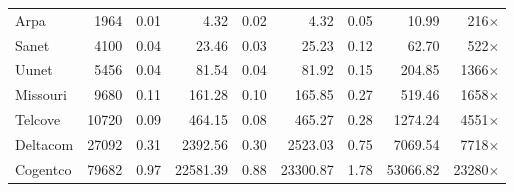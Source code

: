 \begin{tabular}{|l|r|rr|rr|rr|r|}
Arpa & 1964 & 0.01 & 4.32 & 0.02 & 4.32 & 0.05 & 10.99 & 216$\times$\\
Sanet & 4100 & 0.04 & 23.46 & 0.03 & 25.23 & 0.12 & 62.70 & 522$\times$\\
Uunet & 5456 & 0.04 & 81.54 & 0.04 & 81.92 & 0.15 & 204.85 & 1366$\times$\\
Missouri & 9680 & 0.11 & 161.28 & 0.10 & 165.85 & 0.27 & 519.46 & 1658$\times$\\
Telcove & 10720 & 0.09 & 464.15 & 0.08 & 465.27 & 0.28 & 1274.24 & 4551$\times$\\
Deltacom & 27092 & 0.31 & 2392.56 & 0.30 & 2523.03 & 0.75 & 7069.54 & 7718$\times$\\
Cogentco & 79682 & 0.97 & 22581.39 & 0.88 & 23300.87 & 1.78 & 53066.82 & 23280$\times$\\

\end{tabular}
